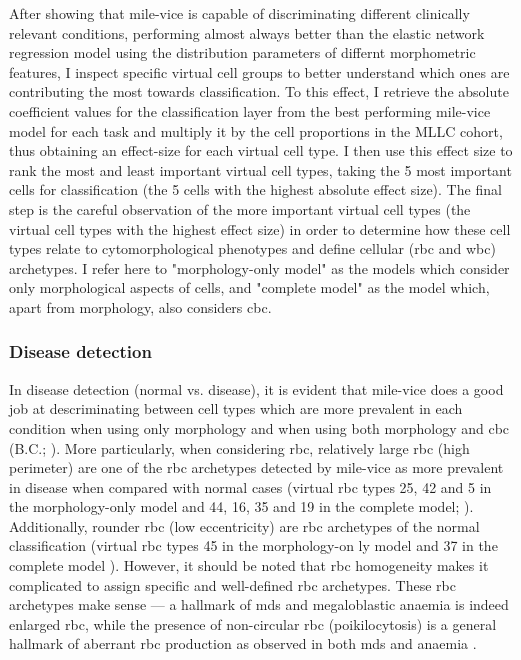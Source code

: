 After showing that \ac{mile-vice} is capable of discriminating different clinically relevant conditions, performing almost always better than the elastic network regression model using the distribution parameters of differnt morphometric features, I inspect specific virtual cell groups to better understand which ones are contributing the most towards classification. To this effect, I retrieve the absolute coefficient values for the classification layer from the best performing \ac{mile-vice} model for each task and multiply it by the cell proportions in the MLLC cohort, thus obtaining an effect-size for each virtual cell type. I then use this effect size to rank the most and least important virtual cell types, taking the 5 most important cells for classification (the 5 cells with the highest absolute effect size). The final step is the careful observation of the more important virtual cell types (the virtual cell types with the highest effect size) in order to determine how these cell types relate to cytomorphological phenotypes and define cellular (\ac{rbc} and \ac{wbc}) archetypes. I refer here to "morphology-only model" as the models which consider only morphological aspects of cells, and "complete model" as the model which, apart from morphology, also considers \ac{cbc}. 

\subsubsection{Disease detection} 

In disease detection (normal vs. disease), it is evident that \ac{mile-vice} does a good job at descriminating between cell types which are more prevalent in each condition when using only morphology and when using both morphology and \ac{cbc} (B.C.; ). More particularly, when considering \ac{rbc}, relatively large \ac{rbc} (high perimeter) are one of the \ac{rbc} archetypes detected by \ac{mile-vice} as more prevalent in disease when compared with normal cases (virtual \ac{rbc} types 25, 42 and 5 in the morphology-only model and 44, 16, 35 and 19 in the complete model; ). Additionally, rounder \ac{rbc} (low eccentricity) are \ac{rbc} archetypes of the normal classification (virtual \ac{rbc} types 45 in the morphology-on ly model and 37 in the complete model ). However, it should be noted that \ac{rbc} homogeneity makes it complicated to assign specific and well-defined \ac{rbc} archetypes. These \ac{rbc} archetypes make sense --- a hallmark of \ac{mds} and megaloblastic anaemia is indeed enlarged \ac{rbc}, while the presence of non-circular \ac{rbc} (poikilocytosis) is a general hallmark of aberrant \ac{rbc} production as observed in both \ac{mds} and anaemia \cite{Ford2013-nd}. 

